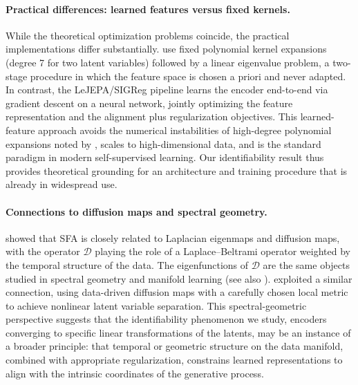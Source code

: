 \paragraph{Practical differences: learned features versus fixed kernels.}
While the theoretical optimization problems coincide, the practical implementations differ substantially.
\citet{sprekeler2014} use fixed polynomial kernel expansions (degree 7 for two latent variables) followed by a linear eigenvalue problem, a two-stage procedure in which the feature space is chosen a priori and never adapted.
In contrast, the LeJEPA/SIGReg pipeline learns the encoder end-to-end via gradient descent on a neural network, jointly optimizing the feature representation and the alignment plus regularization objectives.
This learned-feature approach avoids the numerical instabilities of high-degree polynomial expansions noted by \citet{sprekeler2014}, scales to high-dimensional data, and is the standard paradigm in modern self-supervised learning.
Our identifiability result thus provides theoretical grounding for an architecture and training procedure that is already in widespread use. %

\paragraph{Connections to diffusion maps and spectral geometry.}
\citet{sprekeler2011} showed that SFA is closely related to Laplacian eigenmaps and diffusion maps, with the operator $\mathcal{D}$ playing the role of a Laplace--Beltrami operator weighted by the temporal structure of the data.
The eigenfunctions of $\mathcal{D}$ are the same objects studied in spectral geometry and manifold learning (see also \citep{balestriero2022contrastivenoncontrastiveselfsupervisedlearning}).
\citet{singer2008} exploited a similar connection, using data-driven diffusion maps with a carefully chosen local metric to achieve nonlinear latent variable separation.
This spectral-geometric perspective suggests that the identifiability phenomenon we study, encoders converging to specific linear transformations of the latents, may be an instance of a broader principle: that temporal or geometric structure on the data manifold, combined with appropriate regularization, constrains learned representations to align with the intrinsic coordinates of the generative process.

